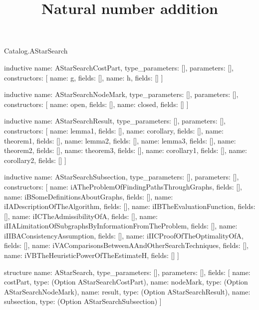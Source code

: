 \begin{lexlean}{Catalog.AStarSearch}
\title{Natural number addition}
\begin{semanticmodule}
inductive{
  name: AStarSearchCostPart,
  type_parameters: [],
  parameters: [],
  constructors: [
    {name: g, fields: []},
    {name: h, fields: []}
  ]
}

inductive{
  name: AStarSearchNodeMark,
  type_parameters: [],
  parameters: [],
  constructors: [
    {name: open, fields: []},
    {name: closed, fields: []}
  ]
}

inductive{
  name: AStarSearchResult,
  type_parameters: [],
  parameters: [],
  constructors: [
    {name: lemma1, fields: []},
    {name: corollary, fields: []},
    {name: theorem1, fields: []},
    {name: lemma2, fields: []},
    {name: lemma3, fields: []},
    {name: theorem2, fields: []},
    {name: theorem3, fields: []},
    {name: corollary1, fields: []},
    {name: corollary2, fields: []}
  ]
}

inductive{
  name: AStarSearchSubsection,
  type_parameters: [],
  parameters: [],
  constructors: [
    {name: iATheProblemOfFindingPathsThroughGraphs, fields: []},
    {name: iBSomeDefinitionsAboutGraphs, fields: []},
    {name: iIADescriptionOfTheAlgorithm, fields: []},
    {name: iIBTheEvaluationFunction, fields: []},
    {name: iICTheAdmissibilityOfA, fields: []},
    {name: iIIALimitationOfSubgraphsByInformationFromTheProblem, fields: []},
    {name: iIIBAConsistencyAssumption, fields: []},
    {name: iIICProofOfTheOptimalityOfA, fields: []},
    {name: iVAComparisonsBetweenAAndOtherSearchTechniques, fields: []},
    {name: iVBTheHeuristicPowerOfTheEstimateH, fields: []}
  ]
}

structure{
  name: AStarSearch,
  type_parameters: [],
  parameters: [],
  fields: [
    {name: costPart, type: (Option AStarSearchCostPart)},
    {name: nodeMark, type: (Option AStarSearchNodeMark)},
    {name: result, type: (Option AStarSearchResult)},
    {name: subsection, type: (Option AStarSearchSubsection)}
  ]
}
\end{semanticmodule}
\end{lexlean}
